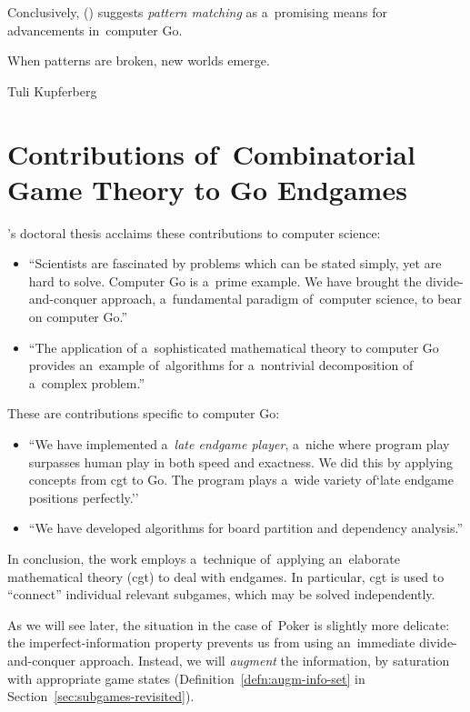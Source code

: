 Conclusively, (\cite{Muller1995computer}) suggests \emph{pattern matching} as a~promising means for advancements in~computer Go.

\epigraph{When patterns are broken, new worlds emerge.}
{Tuli Kupferberg}

\section{Contributions of~Combinatorial Game Theory to Go Endgames}
\Mueller's doctoral thesis acclaims these contributions to computer science:
\begin{itemize}
  \item ``Scientists are fascinated by problems which can be stated simply, yet are hard to solve.
    Computer Go is a~prime example.
    We have brought the divide-and-conquer approach, a~fundamental paradigm of~computer science, to bear on computer Go.''

  \item ``The application of a~sophisticated mathematical theory to computer Go provides an~example of~algorithms for a~nontrivial decomposition of a~complex problem.''
\end{itemize}

\noindent
These are contributions specific to computer Go:
\begin{itemize}
  \item ``We have implemented a~\emph{late endgame player}, a~niche where program play surpasses human play in both speed and exactness.
    We did this by applying concepts from \acrshort{cgt} to Go.
    The program plays a~wide variety of`late endgame positions perfectly.''

  \item ``We have developed algorithms for board partition and dependency analysis.''
\end{itemize}
In conclusion, the work employs a~technique of~applying an~elaborate mathematical theory (\acrshort{cgt}) to deal with endgames.
In particular, \acrshort{cgt} is used to ``connect'' individual relevant subgames, which may be solved independently.

As we will see later, the situation in the case of~Poker is slightly more delicate:
the imperfect-information property prevents us from using an~immediate divide-and-conquer approach.
Instead, we will \emph{augment} the information, by saturation with appropriate game states (Definition~\ref{defn:augm-info-set} in Section~\ref{sec:subgames-revisited}).

